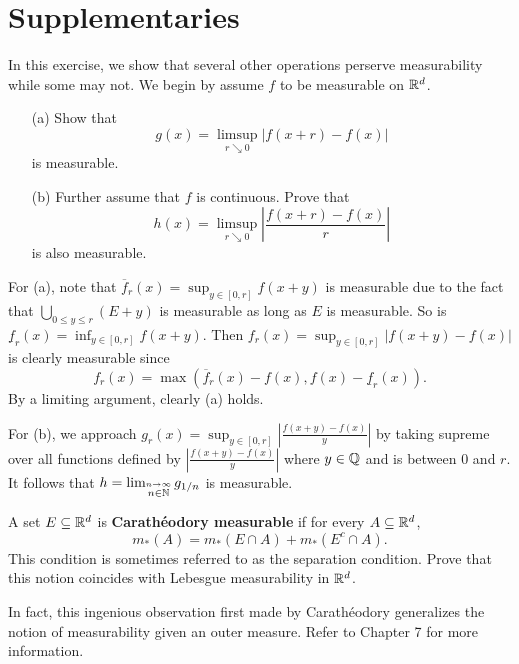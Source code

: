 \section{Supplementaries}

\begin{Exercise}[a]
  In this exercise, we show that several other operations perserve measurability while some may not.
  We begin by assume $f$ to be measurable on $\mathbb{R}^d$.
  \begin{itemize}
    \item [(a)] Show that
    $$
    g(x)=\limsup_{r\searrow0}|f(x+r)-f(x)|
    $$
    is measurable.
    \item [(b)] Further assume that $f$ is continuous. Prove that
    $$
    h(x)=\limsup_{r\searrow0}\left|\frac{f(x+r)-f(x)}{r}\right|
    $$
    is also measurable.
  \end{itemize}
\end{Exercise}

\begin{Solution}
  For (a), note that $\overline{f}_r(x)=\sup_{y\in[0,r]}f(x+y)$ is measurable due to the fact that $\bigcup_{0\leq y\leq r}(E+y)$ is measurable as long as $E$ is measurable. So is $\underline{f}_r(x)=\inf_{y\in[0,r]}f(x+y)$. Then \mbox{$f_r(x)=\sup_{y\in[0,r]}|f(x+y)-f(x)|$} is clearly measurable since
  $$
  f_r(x)=\max(\overline{f}_r(x)-f(x),f(x)-\underline{f}_r(x)).
  $$
  By a limiting argument, clearly (a) holds.

  For (b), we approach $g_r(x)=\sup_{y\in[0,r]}\left|\frac{f(x+y)-f(x)}y\right|$ by taking supreme over all functions defined by $\left|\frac{f(x+y)-f(x)}{y}\right|$ where $y\in\mathbb{Q}$ and is between $0$ and $r$. It follows that $h=\lim_{\stackrel{n\to\infty}{n\in\mathbb{N}}}g_{1/n}$ is measurable.
\end{Solution}

\begin{Exercise}
  A set $E\subseteq\mathbb{R}^d$ is \textbf{Carath\'eodory measurable} if for every $A\subseteq\mathbb{R}^d$,
  $$
  m_*(A)=m_*(E\cap A)+m_*(E^c\cap A).
  $$
  This condition is sometimes referred to as the separation condition. Prove that this notion coincides with Lebesgue measurability in $\mathbb{R}^d$.

  In fact, this ingenious observation first made by Carath\'eodory generalizes the notion of measurability given an outer measure. Refer to Chapter 7 for more information.
\end{Exercise}

